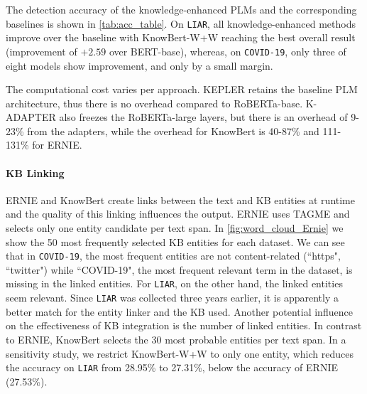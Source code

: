 \documentclass[letterpaper]{article} %
\begin{document}
The detection accuracy of the knowledge-enhanced PLMs and the corresponding baselines is shown in \autoref{tab:acc_table}.
On \texttt{LIAR}, all knowledge-enhanced methods improve over the baseline with KnowBert-W+W reaching the best overall result (improvement of $+2.59$ over BERT-base), whereas, on \texttt{COVID-19}, only %
three of eight models show improvement, and only by a small margin.

The computational cost varies per approach.
KEPLER retains the baseline PLM architecture, thus there is no overhead compared to RoBERTa-base.
K-ADAPTER also freezes the RoBERTa-large layers, but there is an overhead of 9-23\% from the adapters, while the overhead for KnowBert is 40-87\% and 111-131\% for ERNIE.

\paragraph{KB Linking}
ERNIE and KnowBert create links between the text and KB entities at runtime and the quality of this linking influences the output.
ERNIE uses TAGME and selects only one entity candidate per text span.
In \autoref{fig:word_cloud_Ernie} we show the 50  most frequently selected KB entities for each dataset.
We can see that in \texttt{COVID-19}, the most frequent entities are not content-related (``https", ``twitter") while ``COVID-19", the most frequent relevant term in the dataset, is missing in the linked entities.
For \texttt{LIAR}, on the other hand, the linked entities seem relevant.
Since \texttt{LIAR} was collected three years earlier, it is apparently a better match for the entity linker and the KB used.
Another potential influence on the effectiveness of KB integration is the number of linked entities.
In contrast to ERNIE, KnowBert selects the 30 most probable entities per text span.
In a sensitivity study, we restrict KnowBert-W+W to only one entity, which reduces the accuracy on \texttt{LIAR} from 28.95\% to 27.31\%, below the accuracy of ERNIE (27.53\%).
\end{document}
